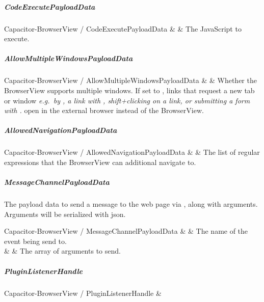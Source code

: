 \subparagraph{CodeExecutePayloadData}

\begin{interfacedesc}{Capacitor-BrowserView / CodeExecutePayloadData}
   &  & The JavaScript to execute. \\ \hline
\end{interfacedesc}

\subparagraph{AllowMultipleWindowsPayloadData}

\begin{interfacedesc}{Capacitor-BrowserView / AllowMultipleWindowsPayloadData}
   &  & Whether the BrowserView supports multiple windows. If set to , links that request a new tab or window \textit{e.g.\ by , a link with , shift+clicking on a link, or submitting a form with .} open in the external browser instead of the BrowserView. \\ \hline
\end{interfacedesc}

\newpage

\subparagraph{AllowedNavigationPayloadData}

\begin{interfacedesc}{Capacitor-BrowserView / AllowedNavigationPayloadData}
   &  & The list of regular expressions that the BrowserView can additional navigate to. \\ \hline
\end{interfacedesc}

\subparagraph{MessageChannelPayloadData}

The payload data to send a message to the web page via ,
along with arguments. Arguments will be serialized with \ac{json}.

\begin{interfacedesc}{Capacitor-BrowserView / MessageChannelPayloadData}
   &  & The name of the event being send to. \\ \hline
        &   & The array of arguments to send. \\ \hline
\end{interfacedesc}

\subparagraph{PluginListenerHandle}

\begin{interface}{Capacitor-BrowserView / PluginListenerHandle}
   &  \\ \hline
\end{interface}

